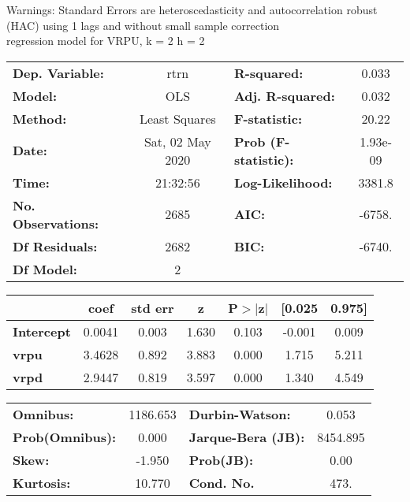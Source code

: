 Warnings: \newline
 [1] Standard Errors are heteroscedasticity and autocorrelation robust (HAC) using 1 lags and without small sample correction\\ 

regression model for VRPU, k = 2 h = 2\begin{center}
\begin{tabular}{lclc}
\toprule
\textbf{Dep. Variable:}    &       rtrn       & \textbf{  R-squared:         } &     0.033   \\
\textbf{Model:}            &       OLS        & \textbf{  Adj. R-squared:    } &     0.032   \\
\textbf{Method:}           &  Least Squares   & \textbf{  F-statistic:       } &     20.22   \\
\textbf{Date:}             & Sat, 02 May 2020 & \textbf{  Prob (F-statistic):} &  1.93e-09   \\
\textbf{Time:}             &     21:32:56     & \textbf{  Log-Likelihood:    } &    3381.8   \\
\textbf{No. Observations:} &        2685      & \textbf{  AIC:               } &    -6758.   \\
\textbf{Df Residuals:}     &        2682      & \textbf{  BIC:               } &    -6740.   \\
\textbf{Df Model:}         &           2      & \textbf{                     } &             \\
\bottomrule
\end{tabular}
\begin{tabular}{lcccccc}
                   & \textbf{coef} & \textbf{std err} & \textbf{z} & \textbf{P$> |$z$|$} & \textbf{[0.025} & \textbf{0.975]}  \\
\midrule
\textbf{Intercept} &       0.0041  &        0.003     &     1.630  &         0.103        &       -0.001    &        0.009     \\
\textbf{vrpu}      &       3.4628  &        0.892     &     3.883  &         0.000        &        1.715    &        5.211     \\
\textbf{vrpd}      &       2.9447  &        0.819     &     3.597  &         0.000        &        1.340    &        4.549     \\
\bottomrule
\end{tabular}
\begin{tabular}{lclc}
\textbf{Omnibus:}       & 1186.653 & \textbf{  Durbin-Watson:     } &    0.053  \\
\textbf{Prob(Omnibus):} &   0.000  & \textbf{  Jarque-Bera (JB):  } & 8454.895  \\
\textbf{Skew:}          &  -1.950  & \textbf{  Prob(JB):          } &     0.00  \\
\textbf{Kurtosis:}      &  10.770  & \textbf{  Cond. No.          } &     473.  \\
\bottomrule
\end{tabular}
\end{center}

